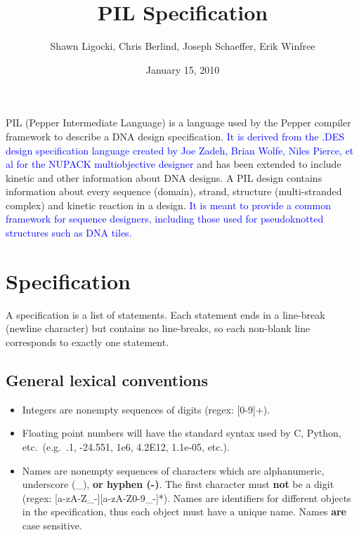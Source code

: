 \documentclass{article}
\newcommand{\add}[1]{\textcolor{blue}{#1}}
\begin{document}
\title{PIL Specification}
\author{Shawn Ligocki, Chris Berlind, Joseph Schaeffer, Erik Winfree}
\date{January 15, 2010}
\maketitle

PIL (Pepper Intermediate Language) is a language used by the Pepper
compiler framework to describe a DNA design specification. \add{It is
derived from the .DES design specification language created by Joe
Zadeh, Brian Wolfe, Niles Pierce, et al for the NUPACK multiobjective designer} and
has been extended to include kinetic and other information about DNA
designs. A PIL design contains information about every sequence
(domain), strand, structure (multi-stranded complex) and kinetic
reaction in a design.  \add{It is meant to provide a common framework for
sequence designers, including those used for pseudoknotted structures
such as DNA tiles.}




\section{Specification}

A specification is a list of statements. Each statement ends in a
line-break (newline character) but contains no line-breaks, so each non-blank line corresponds to exactly one statement.


\subsection{General lexical conventions}
\begin{itemize}
\item Integers are nonempty sequences of digits (regex: [0-9]+).

\item Floating point numbers will have the standard syntax used by C, Python, etc.\ (e.g.\ .1, -24.551, 1e6, 4.2E12, 1.1e-05, etc.).

\item Names are nonempty sequences of characters which are alphanumeric, underscore (\_), \textbf{or hyphen (-)}. The first character must \textbf{not} be a digit (regex: [a-zA-Z\_-][a-zA-Z0-9\_-]*). Names are identifiers for different objects in the specification, thus each object must have a unique name. Names \textbf{are} case sensitive.
\end{itemize}
\end{document}
